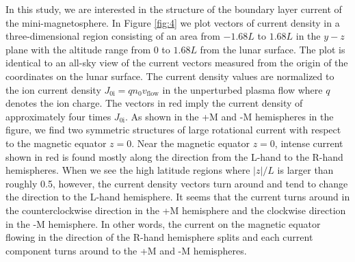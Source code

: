 \documentclass[draft,jgrga]{agutex2015}
\begin{document}
\begin{article}
In this study, 
we are interested in the structure of the boundary layer current  
of the mini-magnetosphere.
In Figure \ref{fig:4} 
we plot vectors of current density in a three-dimensional region 
consisting of an area from $-1.68L$ to $1.68L$ in the $y-z$ plane
with the altitude range from 0 to $1.68L$ from the lunar surface.
The plot is identical to an all-sky view of the current vectors
measured from the origin of the coordinates on the lunar surface. 
The current density values are normalized to 
the ion current density $J_\mathrm{0i}=qn_{0}v_{\mathrm{flow}}$
in the unperturbed plasma flow where $q$ denotes the ion charge.
The vectors in red imply the current density of approximately four times $J_\mathrm{0i}$.
As shown in the +M and -M hemispheres in the figure, 
we find two symmetric structures of large rotational current 
with respect to the magnetic equator $z=0$. 
Near the magnetic equator $z=0$, 
intense current shown in red is found mostly along 
the direction from the L-hand to the R-hand hemispheres.
When we see the high latitude regions where $|z|/L$ is larger than roughly 0.5,   
however, the current density vectors turn around and tend to 
change the direction to the L-hand hemisphere. 
It seems that the current turns around in the counterclockwise direction 
in the +M hemisphere and the clockwise direction in the -M hemisphere.
In other words, the current on the magnetic equator flowing in the direction of 
the R-hand hemisphere splits and each current component turns around 
to the +M and -M hemispheres.


\end{article}
\end{document}
